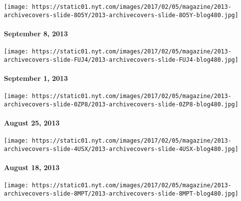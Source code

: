\href{http://www.nytimes.com/indexes/2013/09/08/magazine/index.html}{}

\texttt{[image: https://static01.nyt.com/images/2017/02/05/magazine/2013-archivecovers-slide-8O5Y/2013-archivecovers-slide-8O5Y-blog480.jpg]}

\hypertarget{september-8-2013}{%
\paragraph{September 8, 2013}\label{september-8-2013}}

\href{http://www.nytimes.com/indexes/2013/09/01/magazine/index.html}{}

\texttt{[image: https://static01.nyt.com/images/2017/02/05/magazine/2013-archivecovers-slide-FUJ4/2013-archivecovers-slide-FUJ4-blog480.jpg]}

\hypertarget{september-1-2013}{%
\paragraph{September 1, 2013}\label{september-1-2013}}

\href{http://www.nytimes.com/indexes/2013/08/25/magazine/index.html}{}

\texttt{[image: https://static01.nyt.com/images/2017/02/05/magazine/2013-archivecovers-slide-0ZP8/2013-archivecovers-slide-0ZP8-blog480.jpg]}

\hypertarget{august-25-2013}{%
\paragraph{August 25, 2013}\label{august-25-2013}}

\href{http://www.nytimes.com/indexes/2013/08/18/magazine/index.html}{}

\texttt{[image: https://static01.nyt.com/images/2017/02/05/magazine/2013-archivecovers-slide-4USX/2013-archivecovers-slide-4USX-blog480.jpg]}

\hypertarget{august-18-2013}{%
\paragraph{August 18, 2013}\label{august-18-2013}}

\href{http://www.nytimes.com/indexes/2013/08/11/magazine/index.html}{}

\texttt{[image: https://static01.nyt.com/images/2017/02/05/magazine/2013-archivecovers-slide-8MPT/2013-archivecovers-slide-8MPT-blog480.jpg]}

